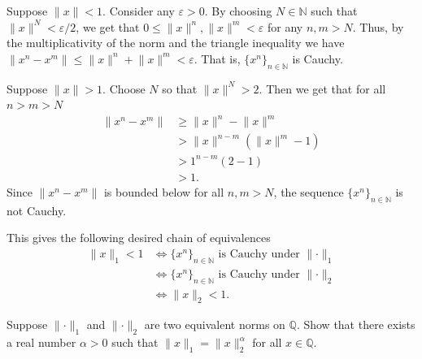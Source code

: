 \documentclass[12 pt, letterpaper]{hmcpset}
\begin{document}
\begin{solution}
	Suppose $\lVert x \rVert < 1$. Consider any $\varepsilon > 0$. By choosing $N \in \mathbb{N}$ such that $\lVert x \rVert^{N} < \varepsilon / 2$, we get that $0 \le \lVert x \rVert^{n}, \lVert x \rVert^{m} < \varepsilon$ for any $n, m > N$. Thus, by the multiplicativity of the norm and the triangle inequality we have $\lVert x^{n} - x^{m} \rVert \le \lVert x \rVert^{n} + \lVert x \rVert^{m} < \varepsilon$. That is, $\{ x^{n} \}_{n \in \mathbb{N}}$ is Cauchy.

	Suppose $\lVert x \rVert > 1$. Choose $N$ so that $\lVert x \rVert^{N} > 2$. Then we get that for all $n > m > N$
	\begin{align*}
		\lVert x^{n} - x^{m} \rVert & \ge \lVert x \rVert^{n} - \lVert x \rVert^{m} \\
					    & > \lVert x \rVert^{n - m} (\lVert x \rVert^{m} - 1) \\
					    & > 1^{n - m} (2 - 1) \\
					    & > 1.
	\end{align*}
	Since $\lVert x^{n} - x^{m} \rVert$ is bounded below for all $n, m > N$, the sequence $\{ x^{n}	 \}_{n \in \mathbb{N}}$ is not Cauchy.

	This gives the following desired chain of equivalences
	\begin{align*}
		\lVert x \rVert_{1} < 1 & \iff \{ x^{n} \}_{n \in \mathbb{N}} \text{ is Cauchy under }  \lVert \cdot \rVert_{1} \\
					& \iff \{ x^{n} \}_{n \in \mathbb{N}} \text{ is Cauchy under } \lVert \cdot \rVert_{2} \\
					& \iff \lVert x \rVert_{2} < 1.
	\end{align*}
\end{solution}

\pagebreak

\begin{problem}[(4)]
	Suppose $\lVert \cdot \rVert_{1}$ and $\lVert \cdot \rVert_{2}$ are two equivalent norms on $\mathbb{Q}$. Show that there exists a real number $\alpha > 0$ such that $\lVert x \rVert_{1} = \lVert x \rVert_{2}^{\alpha}$ for all $x \in \mathbb{Q}$.
\end{problem}
\end{document}
